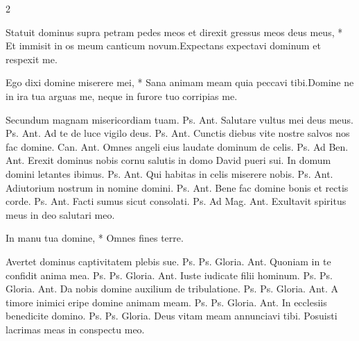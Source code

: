 \begin{multicols*}{2}
\begin{responsory}
{Statuit dominus supra petram pedes meos et direxit gressus meos deus meus, * Et immisit in os meum canticum novum.}{Expectans expectavi dominum et respexit me.}
\end{responsory}%
\begin{responsory-doxology}
{Ego dixi domine miserere mei, * Sana animam meam quia peccavi tibi.}{Domine ne in ira tua arguas me, neque in furore tuo corripias me.}
\end{responsory-doxology}%
 Secundum magnam misericordiam tuam. {\color{Red} Ps.}  {\color{Red} Ant.} Salutare vultus mei deus meus. {\color{Red} Ps.}  {\color{Red} Ant.} Ad te de luce vigilo deus. {\color{Red} Ps.}  {\color{Red} Ant.} Cunctis diebus vite nostre salvos nos fac domine. {\color{Red} Can.}  {\color{Red} Ant.} Omnes angeli eius laudate dominum de celis. {\color{Red} Ps.}  {\color{Red} Ad Ben. Ant.} Erexit dominus nobis cornu salutis in domo David pueri sui.
 In domum domini letantes ibimus. {\color{Red} Ps.}  {\color{Red} Ant.} Qui habitas in celis miserere nobis. {\color{Red} Ps.}  {\color{Red} Ant.} Adiutorium nostrum in nomine domini. {\color{Red} Ps.}  {\color{Red} Ant.} Bene fac domine bonis et rectis corde. {\color{Red} Ps.}  {\color{Red} Ant.} Facti sumus sicut consolati. {\color{Red} Ps.}  {\color{Red} Ad Mag. Ant.} Exultavit spiritus meus in deo salutari meo.
{\color{Red} }
\par {}
\begin{invitatory}
{In manu tua domine, * Omnes fines terre.}
\end{invitatory}
 Avertet dominus captivitatem plebis sue. {\color{Red} Ps.}  {\color{Red} Ps.}  Gloria. {\color{Red} Ant.} Quoniam in te confidit anima mea. {\color{Red} Ps.}  {\color{Red} Ps.}  Gloria. {\color{Red} Ant.} Iuste iudicate filii hominum. {\color{Red} Ps.}  {\color{Red} Ps.}  Gloria. {\color{Red} Ant.} Da nobis domine auxilium de tribulatione. {\color{Red} Ps.}  {\color{Red} Ps.}  Gloria. {\color{Red} Ant.} A timore inimici eripe domine animam meam. {\color{Red} Ps.} {\color{Red} Ps.}   Gloria. {\color{Red} Ant.} In ecclesiis benedicite domino. {\color{Red} Ps.}  {\color{Red} Ps.}  Gloria. \V Deus vitam meam annunciavi tibi. \R Posuisti lacrimas meas in conspectu meo. \R

\end{multicols*}
